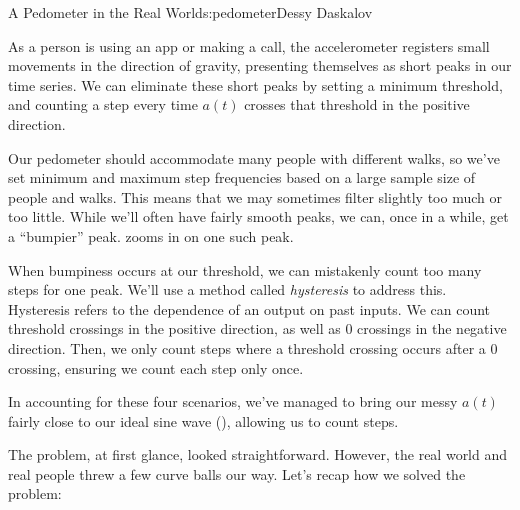 \begin{aosachapter}{A Pedometer in the Real World}{s:pedometer}{Dessy Daskalov}
\label{short-peaks}

As a person is using an app or making a call, the accelerometer
registers small movements in the direction of gravity, presenting
themselves as short peaks in our time series. We can eliminate these
short peaks by setting a minimum threshold, and counting a step every
time $a(t)$ crosses that threshold in the positive direction.

\label{bumpy-peaks}

Our pedometer should accommodate many people with different walks, so
we've set minimum and maximum step frequencies based on a large sample
size of people and walks. This means that we may sometimes filter
slightly too much or too little. While we'll often have fairly smooth
peaks, we can, once in a while, get a ``bumpier'' peak.
 zooms in on one such peak.

When bumpiness occurs at our threshold, we can mistakenly count too many
steps for one peak. We'll use a method called \emph{hysteresis} to
address this. Hysteresis refers to the dependence of an output on past
inputs. We can count threshold crossings in the positive direction, as
well as 0 crossings in the negative direction. Then, we only count steps
where a threshold crossing occurs after a 0 crossing, ensuring we count
each step only once.

\label{peaks-that-are-juuuust-right}


In accounting for these four scenarios, we've managed to bring our messy
$a(t)$ fairly close to our ideal sine wave
(), allowing us to count
steps.

\label{recap}

The problem, at first glance, looked straightforward. However, the real
world and real people threw a few curve balls our way. Let's recap how
we solved the problem:

\begin{aosaenumerate}
\def\labelenumi{\arabic{enumi}.}


\end{aosaenumerate}
\end{aosachapter}
